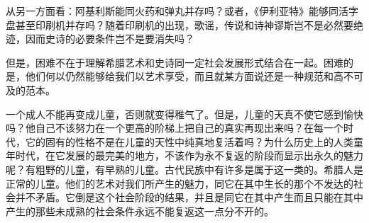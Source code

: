 \documentclass[a4paper,twoside,12pt,AutoFakeBold]{ctexart}
\begin{document}
从另一方面看：阿基利斯能同火药和弹丸并存吗？或者，《伊利亚特》能够同活字盘甚至印刷机并存吗？随着印刷机的出现，歌谣，传说和诗神谬斯岂不是必然要绝迹，因而史诗的必要条件岂不是要消失吗？

但是，困难不在于理解希腊艺术和史诗同一定社会发展形式结合在一起。困难的是，他们何以仍然能够给我们以艺术享受，而且就某方面说还是一种规范和高不可及的范本。

一个成人不能再变成儿童，否则就变得稚气了。但是，儿童的天真不使它感到愉快吗？他自己不该努力在一个更高的阶梯上把自己的真实再现出来吗？在每一个时代，它的固有的性格不是在儿童的天性中纯真地复活着吗？为什么历史上的人类童年时代，在它发展的最完美的地方，不该作为永不复返的阶段而显示出永久的魅力呢？有粗野的儿童，有早熟的儿童。古代民族中有许多是属于这一类的。希腊人是正常的儿童。他们的艺术对我们所产生的魅力，同它在其中生长的那个不发达的社会并不矛盾。它倒是这个社会阶段的结果，并且是同它在其中产生而且只能在其中产生的那些未成熟的社会条件永远不能复返这一点分不开的。

\newpage
\end{document}
